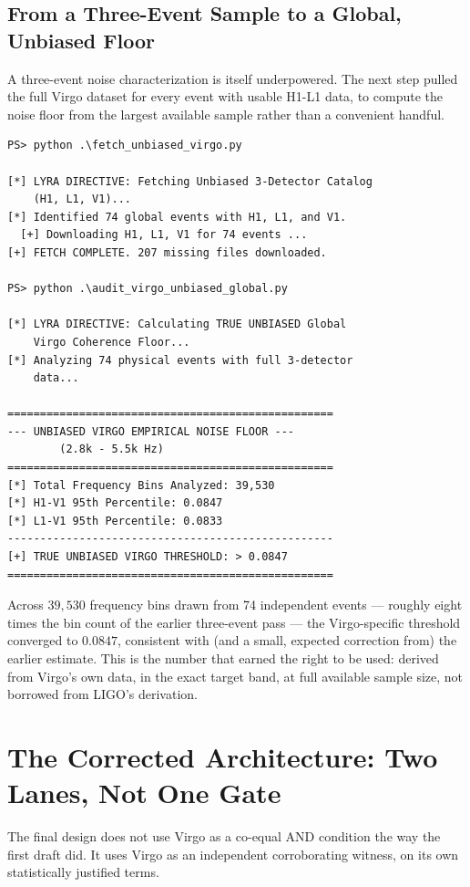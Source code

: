\documentclass[11pt, letterpaper, openany]{book}
\begin{document}
\subsection*{From a Three-Event Sample to a Global, Unbiased Floor}

A three-event noise characterization is itself underpowered. The next
step pulled the full Virgo dataset for every event with usable H1-L1
data, to compute the noise floor from the largest available sample
rather than a convenient handful.

\begin{lstlisting}[style=terminal]
PS> python .\fetch_unbiased_virgo.py

[*] LYRA DIRECTIVE: Fetching Unbiased 3-Detector Catalog
    (H1, L1, V1)...
[*] Identified 74 global events with H1, L1, and V1.
  [+] Downloading H1, L1, V1 for 74 events ...
[+] FETCH COMPLETE. 207 missing files downloaded.

PS> python .\audit_virgo_unbiased_global.py

[*] LYRA DIRECTIVE: Calculating TRUE UNBIASED Global
    Virgo Coherence Floor...
[*] Analyzing 74 physical events with full 3-detector
    data...

==================================================
--- UNBIASED VIRGO EMPIRICAL NOISE FLOOR ---
        (2.8k - 5.5k Hz)
==================================================
[*] Total Frequency Bins Analyzed: 39,530
[*] H1-V1 95th Percentile: 0.0847
[*] L1-V1 95th Percentile: 0.0833
--------------------------------------------------
[+] TRUE UNBIASED VIRGO THRESHOLD: > 0.0847
==================================================
\end{lstlisting}

Across $39{,}530$ frequency bins drawn from 74 independent events ---
roughly eight times the bin count of the earlier three-event pass --- the
Virgo-specific threshold converged to $0.0847$, consistent with (and a
small, expected correction from) the earlier estimate. This is the
number that earned the right to be used: derived from Virgo's own data,
in the exact target band, at full available sample size, not borrowed
from LIGO's derivation.

\clearpage
\section{The Corrected Architecture: Two Lanes, Not One Gate}

The final design does not use Virgo as a co-equal AND condition the way
the first draft did. It uses Virgo as an independent corroborating
witness, on its own statistically justified terms.
\end{document}
